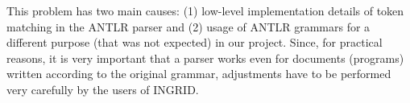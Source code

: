 This problem has two main causes: (1) low-level implementation details of token matching in the ANTLR parser and (2) usage of ANTLR grammars for a different purpose (that was not expected) in our project.
Since, for practical reasons, it is very important that a parser works even for documents (programs) written according to the original grammar, adjustments have to be performed very carefully by the users of INGRID.

